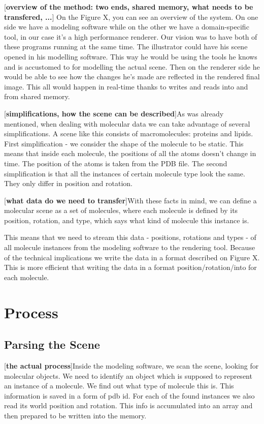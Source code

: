 \documentclass[
  digital, %
  table,   %
  nolof,     %
  nolot,     %
]{fithesis3}
\begin{document}
[\textbf{overview of the method: two ends, shared memory, what needs to be transfered, ...}]
On the Figure X, you can see an overview of the system. On one side we have a modeling software while on the other we have a domain-specific tool, in our case it's a high performance renderer. Our vision was to have both of these programs running at the same time. The illustrator could have his scene opened in his modelling software. This way he would be using the tools he knows and is accustomed to for modelling the actual scene. Then on the renderer side he would be able to see how the changes he's made are reflected in the rendered final image. This all would happen in real-time thanks to writes and reads into and from shared memory.

[\textbf{simplifications, how the scene can be described}]As was already mentioned, when dealing with molecular data we can take advantage of several simplifications. A scene like this consists of macromolecules: proteins and lipids. First simplification - we consider the shape of the molecule to be static. This means that inside each molecule, the positions of all the atoms doesn't change in time. The position of the atoms is taken from the PDB file. The second simplification is that all the instances of certain molecule type look the same. They only differ in position and rotation.

[\textbf{what data do we need to transfer}]With these facts in mind, we can define a molecular scene as a set of molecules, where each molecule is defined by its position, rotation, and type, which says what kind of molecule this instance is.

This means that we need to stream this data - positions, rotations and types - of all molecule instances from the modeling software to the rendering tool. Because of the technical implications we write the data in a format described on Figure X. This is more efficient that writing the data in a format position/rotation/into for each molecule.
\section{Process}
\subsection{Parsing the Scene}
[\textbf{the actual process}]Inside the modeling software, we scan the scene, looking for molecular objects. We need to identify an object which is supposed to represent an instance of a molecule. We find out what type of molecule this is. This information is saved in a form of pdb id. For each of the found instances we also read its world position and rotation. This info is accumulated into an array and then prepared to be written into the memory.
\end{document}
